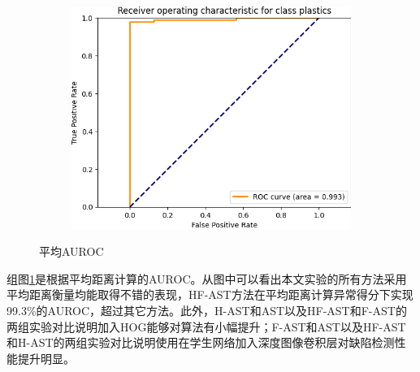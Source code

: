 \begin{figure}[htbp]
\begin{subfigure}
        \end{subfigure}
        \begin{subfigure}
        \centering
        \includegraphics[width=.4\linewidth]{figures/4/auroc/mixhog_experiment/plastics_mean.png} 
        \end{subfigure}
    \caption{平均AUROC}
    \label{fig:auroc_mean}
    \end{figure}
组图\ref{fig:auroc_mean}是根据平均距离计算的AUROC。从图中可以看出本文实验的所有方法采用平均距离衡量均能取得不错的表现，HF-AST方法在平均距离计算异常得分下实现99.3\%的AUROC，超过其它方法。此外，H-AST和AST以及HF-AST和F-AST的两组实验对比说明加入HOG能够对算法有小幅提升；F-AST和AST以及HF-AST和H-AST的两组实验对比说明使用在学生网络加入深度图像卷积层对缺陷检测性能提升明显。


